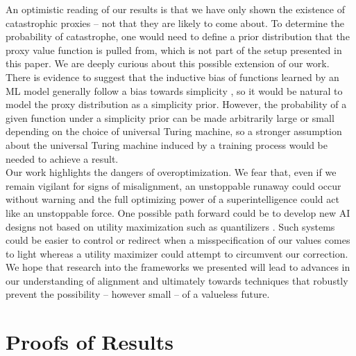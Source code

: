\documentclass{article}
\begin{document}
An optimistic reading of our results is that we have only shown the existence of catastrophic proxies -- not that they are likely to come about. To determine the probability of catastrophe, one would need to define a prior distribution that the proxy value function is pulled from, which is not part of the setup presented in this paper. We are deeply curious about this possible extension of our work. There is evidence to suggest that the inductive bias of functions learned by an ML model generally follow a bias towards simplicity \citep{dingle2020generic}, so it would be natural to model the proxy distribution as a simplicity prior. However, the probability of a given function under a simplicity prior can be made arbitrarily large or small depending on the choice of universal Turing machine, so a stronger assumption about the universal Turing machine induced by a training process would be needed to achieve a result.\\

Our work highlights the dangers of overoptimization. We fear that, even if we remain vigilant for signs of misalignment, an unstoppable runaway could occur without warning and the full optimizing power of a superintelligence could act like an unstoppable force. One possible path forward could be to develop new AI designs not based on utility maximization such as quantilizers \citep{taylor2016quantilizers}. Such systems could be easier to control or redirect when a misspecification of our values comes to light whereas a utility maximizer could attempt to circumvent our correction.\\

We hope that research into the frameworks we presented will lead to advances in our understanding of alignment and ultimately towards techniques that robustly prevent the possibility -- however small -- of a valueless future.

\appendix 
\section{Proofs of Results} \label{sec: proofsOfResults}
\end{document}
